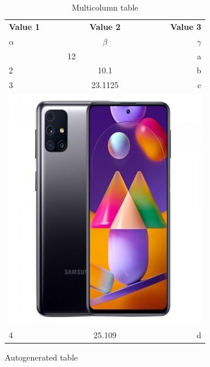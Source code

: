 \documentclass{article}
\begin{document}
	\begin{table}[h!]
		\begin{center}
		\caption{Multicolumn table}
		\label{tab:table 3}
			\begin{tabular}{|l|c|r|}
				\hline
				\textbf{Value 1} & \textbf{Value 2} & \textbf{Value 3}\\
				$\alpha$ & $\beta$ & $\gamma$\\
				\hline
				\multicolumn{2}{|c|}{12} & a\\
				\hline
				2 & 10.1 & b\\
				3 & 23.1125 & c\\
				\hline
				\multicolumn{3}{|c|}{\includegraphics[width=0.09\linewidth]{phone.jpg}}\\
				\hline
				4 & 25.109 & d\\
				\hline
			\end{tabular}
		\end{center}
	\end{table}
	\newpage
	
%	
	
	\begin{table}[h!]
		\caption{Autogenerated table}
		\label{table1}
		
		
	\end{table}
\end{document}
